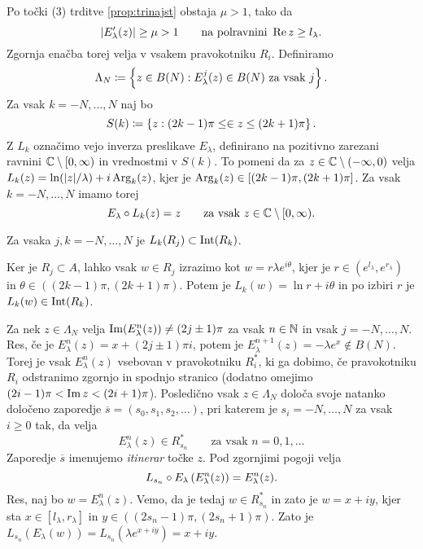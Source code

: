 Po točki (3) trditve \ref{prop:trinajst} obstaja \(\mu > 1\), tako da
\begin{equation} \label{eqn:mu-ocena}
    |E_\lambda' (z)| \geq \mu > 1 \qquad \text{na polravnini } \operatorname{Re} z \geq l_\lambda.
\end{equation}
Zgornja enačba torej velja v vsakem pravokotniku \(R_i\). Definiramo
\[\Lambda_N \coloneq \left\{ z \in B(N) : E_\lambda^j (z) \in B (N) \text{ za vsak } j \right\}.\]
Za vsak \(k = -N, \dots, N\) naj bo
\[S (k) \coloneq \left\{ z : (2k - 1) \pi \leq \in z \leq (2k + 1) \pi \right\}.\]
Z \(L_k\) označimo vejo inverza preslikave \(E_\lambda\), definirano na pozitivno zarezani ravnini \(\mathbb C \setminus [0, \infty)\) in vrednostmi v \(S (k)\). To pomeni da za \(z \in \mathbb C \setminus (- \infty, 0)\) velja \(L_k (z) = \ln (|z| / \lambda) + i \operatorname{Arg}_k (z)\), kjer je \(\operatorname{Arg}_k (z) \in [(2k - 1) \pi, (2k + 1) \pi]\). Za vsak \(k = - N, \dots, N\) imamo torej
\begin{equation} \label{eqn:inverz-e}
    E_\lambda \circ L_k (z) = z \qquad \text{za vsak } z \in \mathbb C \setminus [0, \infty).
\end{equation}

\begin{trditev} \label{prop:claim}
    Za vsaka \(j, k = -N, \dots, N\) je \(L_k (R_j) \subset \operatorname{Int} (R_k)\).
\end{trditev}

\begin{dokaz}
    Ker je \(R_j \subset A\), lahko vsak \(w \in R_j\) izrazimo kot \(w = r \lambda e^{i \theta}\), kjer je \(r \in (e^{l_\lambda}, e^{r_\lambda})\) in \(\theta \in ((2k - 1) \pi, (2k + 1) \pi)\). Potem je \(L_k (w) = \ln r + i \theta\) in po izbiri \(r\) je \(L_k (w) \in \operatorname{Int} (R_k)\).
\end{dokaz}

Za nek \(z \in \Lambda_N\) velja \(\operatorname{Im} (E_\lambda^n (z)) \neq (2j \pm 1) \pi\) za vsak \(n \in \mathbb N\) in vsak \(j = -N, \dots, N\). Res, če je \(E_\lambda^n (z) = x + (2j \pm 1) \pi i\), potem je \(E_\lambda^{n + 1} (z) = - \lambda e^x \notin B (N)\). Torej je vsak \(E_\lambda^n (z)\) vsebovan v pravokotniku \(R_i^*\), ki ga dobimo, če pravokotniku \(R_i\) odstranimo zgornjo in spodnjo stranico (dodatno omejimo \((2i - 1) \pi < \operatorname{Im} z < (2i + 1) \pi\)). Posledično vsak \(z \in \Lambda_N\) določa svoje natanko določeno zaporedje \(\overline{s} = (s_0, s_1, s_2, \dots)\), pri katerem je \(s_i = -N, \dots, N\) za vsak \(i \geq 0\) tak, da velja
\begin{equation} \label{eqn:itinerar}
    E_\lambda^n (z) \in R_{s_n}^* \qquad \text{za vsak } n = 0, 1, \dots
\end{equation}
Zaporedje \(\overline{s}\) imenujemo \emph{itinerar} točke \(z\). Pod zgornjimi pogoji velja
\begin{equation} \label{eqn:devetpet}
    L_{s_n} \circ E_\lambda \left( E_\lambda^n (z) \right) = E_\lambda^n (z).
\end{equation}
Res, naj bo \(w = E_\lambda^n (z)\). Vemo, da je tedaj \(w \in R_{s_n}^*\) in zato je \(w = x + i y\), kjer sta \(x \in [l_\lambda, r_\lambda]\) in \(y \in ((2 s_n - 1) \pi, (2 s_n + 1) \pi)\). Zato je \(L_{s_n} (E_\lambda (w)) = L_{s_n} (\lambda e^{x + i y}) = x + i y\).

